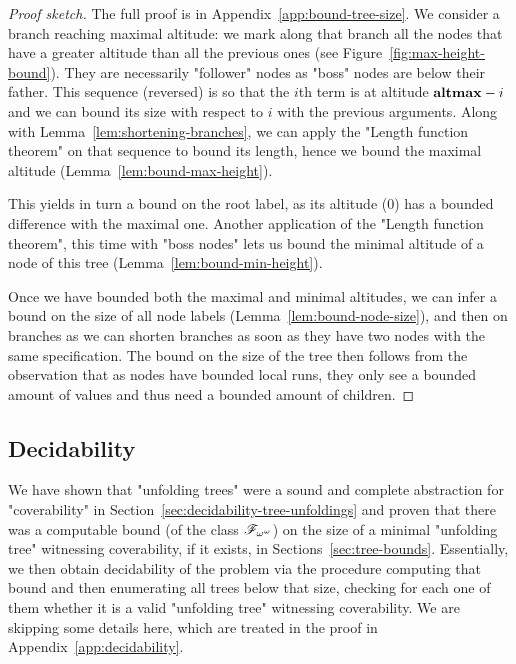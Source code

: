 \begin{proof}[Proof sketch]
	The full proof is in Appendix~\ref{app:bound-tree-size}.
	We consider a branch reaching maximal altitude: we mark along that branch all the nodes that have a greater altitude than all the previous ones (see Figure~\ref{fig:max-height-bound}). They are necessarily "follower" nodes as "boss" nodes are below their father. This sequence (reversed) is so that the $i$th term is at altitude $\mathbf{altmax}-i$ and we can bound its size with respect to $i$ with the previous arguments. Along with Lemma~\ref{lem:shortening-branches}, we can apply the "Length function theorem" on that sequence to bound its length, hence we bound the maximal altitude (Lemma~\ref{lem:bound-max-height}).
	
	This yields in turn a bound on the root label, as its altitude ($0$) has a bounded difference with the maximal one. Another application of the "Length function theorem", this time with "boss nodes" lets us bound the minimal altitude of a node of this tree (Lemma~\ref{lem:bound-min-height}).
	
	Once we have bounded both the maximal and minimal altitudes, we can infer a bound on the size of all node labels (Lemma~\ref{lem:bound-node-size}), and then on branches as we can shorten branches as soon as they have two nodes with the same specification.
	The bound on the size of the tree then follows from the observation that as nodes have bounded local runs, they only see a bounded amount of values and thus need a bounded amount of children.
\end{proof}


\subsection{Decidability}
\label{sec:decidability-end}

We have shown that "unfolding trees" were a sound and complete abstraction for "coverability" in Section~\ref{sec:decidability-tree-unfoldings} and proven that there was a computable bound (of the class $\mathscr{F}_{\omega^\omega}$) on the size of a minimal "unfolding tree" witnessing coverability, if it exists, in Sections~\ref{sec:tree-bounds}. Essentially, we then obtain decidability of the problem via the procedure computing that bound and then enumerating all trees below that size, checking for each one of them whether it is a valid "unfolding tree" witnessing coverability. We are skipping some details here, which are treated in the proof in Appendix~\ref{app:decidability}.

\decidablecover*


